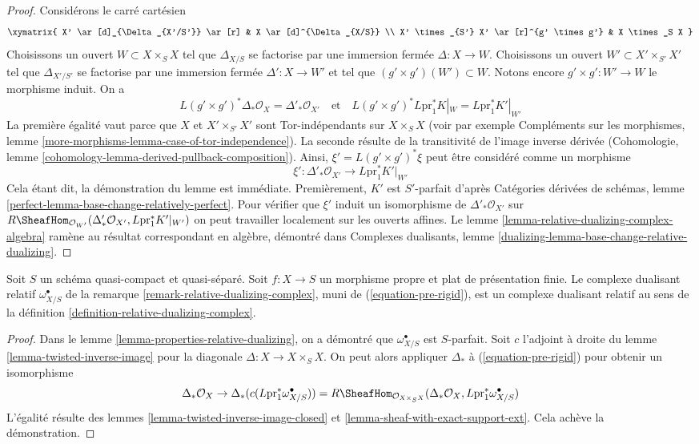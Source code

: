 \begin{proof}
Considérons le carré cartésien
$$
\xymatrix{
X' \ar[d]_{\Delta_{X'/S'}} \ar[r] & X \ar[d]^{\Delta_{X/S}} \\
X' \times_{S'} X' \ar[r]^{g' \times g'} & X \times_S X
}
$$
Choisissons un ouvert $W \subset X \times_S X$ tel que $\Delta_{X/S}$ se factorise par une immersion fermée $\Delta : X \to W$. Choisissons un ouvert $W' \subset X' \times_{S'} X'$ tel que $\Delta_{X'/S'}$ se factorise par une immersion fermée $\Delta' : X \to W'$ et tel que $(g' \times g')(W') \subset W$. Notons encore $g' \times g' : W' \to W$ le morphisme induit. On a
$$
L(g' \times g')^*\Delta_*\mathcal{O}_X =
\Delta'_*\mathcal{O}_{X'}
\quad\text{et}\quad
L(g' \times g')^*L\text{pr}_1^*K|_W =
L\text{pr}_1^*K'|_{W'}
$$
La première égalité vaut parce que $X$ et $X' \times_{S'} X'$ sont Tor-indépendants sur $X \times_S X$ (voir par exemple Compléments sur les morphismes, lemme \ref{more-morphisms-lemma-case-of-tor-independence}). La seconde résulte de la transitivité de l'image inverse dérivée (Cohomologie, lemme \ref{cohomology-lemma-derived-pullback-composition}). Ainsi, $\xi' = L(g' \times g')^*\xi$ peut être considéré comme un morphisme
$$
\xi' : \Delta'_*\mathcal{O}_{X'} \longrightarrow L\text{pr}_1^*K'|_{W'}
$$
Cela étant dit, la démonstration du lemme est immédiate. Premièrement, $K'$ est $S'$-parfait d'après Catégories dérivées de schémas, lemme \ref{perfect-lemma-base-change-relatively-perfect}. Pour vérifier que $\xi'$ induit un isomorphisme de $\Delta'_*\mathcal{O}_{X'}$ sur
$R\SheafHom_{\mathcal{O}_{W'}}(
\Delta'_*\mathcal{O}_{X'}, L\text{pr}_1^*K'|_{W'})$
on peut travailler localement sur les ouverts affines. Le lemme \ref{lemma-relative-dualizing-complex-algebra} ramène au résultat correspondant en algèbre, démontré dans Complexes dualisants, lemme \ref{dualizing-lemma-base-change-relative-dualizing}.
\end{proof}

\begin{lemma}
\label{lemma-flat-proper-relative-dualizing}
Soit $S$ un schéma quasi-compact et quasi-séparé. Soit $f : X \to S$ un morphisme propre et plat de présentation finie. Le complexe dualisant relatif $\omega_{X/S}^\bullet$ de la remarque \ref{remark-relative-dualizing-complex}, muni de (\ref{equation-pre-rigid}), est un complexe dualisant relatif au sens de la définition \ref{definition-relative-dualizing-complex}.
\end{lemma}

\begin{proof}
Dans le lemme \ref{lemma-properties-relative-dualizing}, on a démontré que $\omega_{X/S}^\bullet$ est $S$-parfait. Soit $c$ l'adjoint à droite du lemme \ref{lemma-twisted-inverse-image} pour la diagonale $\Delta : X \to X \times_S X$. On peut alors appliquer $\Delta_*$ à (\ref{equation-pre-rigid}) pour obtenir un isomorphisme
$$
\Delta_*\mathcal{O}_X \to
\Delta_*(c(L\text{pr}_1^*\omega_{X/S}^\bullet)) =
R\SheafHom_{\mathcal{O}_{X \times_S X}}(
\Delta_*\mathcal{O}_X, L\text{pr}_1^*\omega_{X/S}^\bullet)
$$
L'égalité résulte des lemmes \ref{lemma-twisted-inverse-image-closed} et \ref{lemma-sheaf-with-exact-support-ext}. Cela achève la démonstration.
\end{proof}

